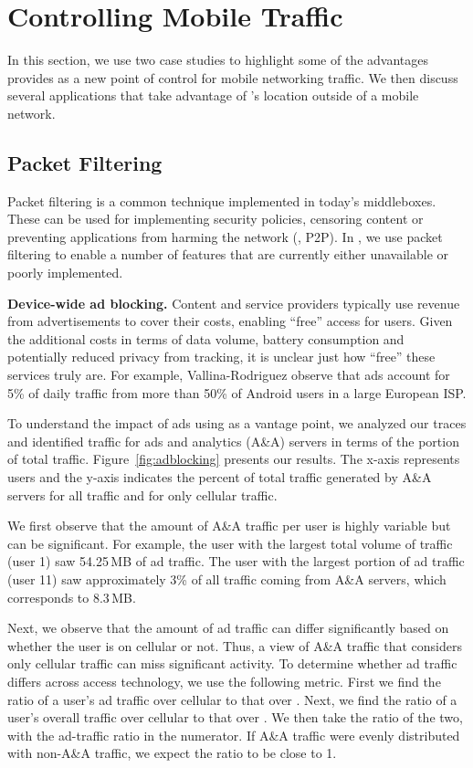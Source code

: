 \section{Controlling Mobile Traffic}
\label{sec:control}
In this section, we use two case studies to highlight some of the 
advantages \meddle provides as a new point of control 
for mobile networking traffic. We then discuss several applications 
that take advantage of \meddle's location outside of a mobile network.

\subsection{Packet Filtering}
\label{sec:filtering}
Packet filtering is a common technique implemented in 
today's middleboxes. These can be used for implementing 
security policies, censoring content or preventing applications 
from harming the network (\eg, P2P). In \meddle, we use 
packet filtering to enable a number of features that are 
currently either unavailable or poorly implemented.

\noindent\textbf{Device-wide ad blocking.} Content and service providers 
typically use revenue from advertisements to cover their costs, enabling 
``free'' access for users. Given the additional costs in terms of data volume, 
battery consumption and potentially reduced privacy from tracking, it is unclear 
just how ``free'' these services truly are. For example, Vallina-Rodriguez \etal \cite{Vallina-rodriguez:2012:AdCache} observe
that ads account for 5\% of daily traffic from more than 50\% of
Android users in a large European ISP. 

To understand the impact of ads using \meddle as a vantage point, we 
analyzed our traces and identified traffic for ads and analytics (A\&A) servers 
in terms of the portion of total traffic. Figure~\ref{fig:adblocking} presents our 
results. The x-axis represents users and the y-axis indicates the percent of 
total traffic generated by A\&A servers for all traffic and for only cellular traffic. 

We first observe that the amount of A\&A traffic per user is highly variable but can be 
significant. For example, the user with the largest total volume of traffic (user 1) saw 
54.25\,MB of ad traffic. The user with the largest portion of ad traffic (user 11) saw 
approximately 3\% of all traffic coming from A\&A servers, which corresponds to 8.3\,MB. 

Next, we observe that the amount of ad traffic can differ significantly 
based on whether the user is on cellular or not. Thus, a view of A\&A 
traffic that considers only cellular traffic can miss significant activity. 
To determine whether ad traffic differs across access technology, we use 
the following metric. First we find the ratio of a user's ad traffic over cellular 
to that over \wifi. Next, we find the ratio of a user's overall traffic over cellular 
to that over \wifi. We then take the ratio of the two, with the ad-traffic ratio 
in the numerator. If A\&A traffic were evenly distributed with non-A\&A traffic, 
we expect the ratio to be close to 1.

